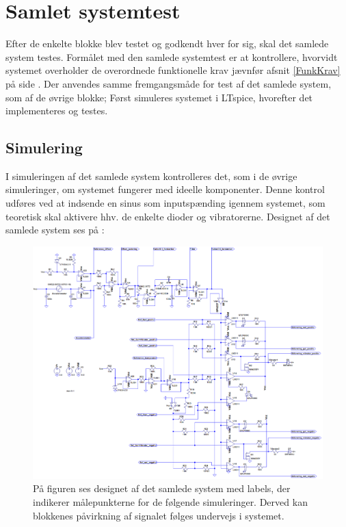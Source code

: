\section{Samlet systemtest}
Efter de enkelte blokke blev testet og godkendt hver for sig, skal det samlede system testes. Formålet med den samlede systemtest er at kontrollere, hvorvidt systemet overholder de overordnede funktionelle krav jævnfør afsnit \ref{FunkKrav} på side \pageref{FunkKrav}. Der anvendes samme fremgangsmåde for test af det samlede system, som af de øvrige blokke; Først simuleres systemet i LTspice, hvorefter det implementeres og testes.

\subsection{Simulering}
I simuleringen af det samlede system kontrolleres det, som i de øvrige simuleringer, om systemet fungerer med ideelle komponenter. Denne kontrol udføres ved at indsende en sinus som inputspænding igennem systemet, som teoretisk skal aktivere hhv. de enkelte dioder og vibratorerne. Designet af det samlede system ses på :
\begin{figure}[H]
	\centering
	\includegraphics[scale=.38]{figures/cProblemloesning/Samlet_system.PNG}
	\caption{På figuren ses designet af det samlede system med labels, der indikerer målepunkterne for de følgende simuleringer. Derved kan blokkenes påvirkning af signalet følges undervejs i systemet.}
	\label{fig:samlet_system}
\end{figure}
